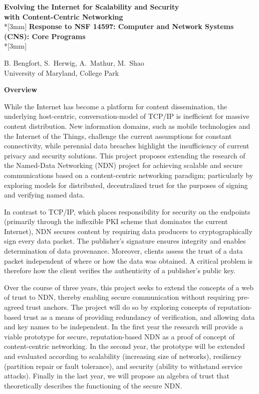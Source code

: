 \documentclass{proposalnsf}
\begin{document}
\begin{center}
{\Large{\bf Evolving the Internet for Scalability and Security \\
with Content-Centric Networking}}\\*[3mm]
{\bf Response to NSF 14597: Computer and Network Systems (CNS): Core Programs} \\*[3mm]

B. Bengfort, S.\ Herwig, A.\ Mathur, M.\ Shao\\
University of Maryland, College Park

\end{center}

\noindent
{\large{\bf Overview}}

\noindent
While the Internet has become a platform for content dissemination, the underlying host-centric, conversation-model of TCP/IP is inefficient for massive content distribution. New information domains, such as mobile technologies and the Internet of the Things, challenge the current assumptions for constant connectivity, while perennial data breaches highlight the insufficiency of current privacy and security solutions. This project proposes extending the research of the Named-Data Networking (NDN) project for achieving scalable and secure communications based on a content-centric networking paradigm; particularly by exploring models for distributed, decentralized trust for the purposes of signing and verifying named data.

In contrast to TCP/IP, which places responsibility for security on the endpoints (primarily through the inflexible PKI scheme that dominates the current Internet), NDN secures content by requiring data producers to cryptographically sign every data packet. The publisher's signature ensures integrity and enables determination of data provenance. Moreover, clients assess the trust of a data packet independent of where or how the data was obtained. A critical problem is therefore how the client verifies the authenticity of a publisher's public key.

Over the course of three years, this project seeks to extend the concepts of a web of trust to NDN, thereby enabling secure communication without requiring pre-agreed trust anchors. The project will do so by exploring concepts of reputation-based trust as a means of providing redundancy of verification, and allowing data and key names to be independent. In the first year the research will provide a viable prototype for secure, reputation-based NDN as a proof of concept of content-centric networking. In the second year, the prototype will be extended and evaluated according to scalability (increasing size of networks), resiliency (partition repair or fault tolerance), and security (ability to withstand service attacks). Finally in the last year, we will propose an algebra of trust that theoretically describes the functioning of the secure NDN.
\end{document}
